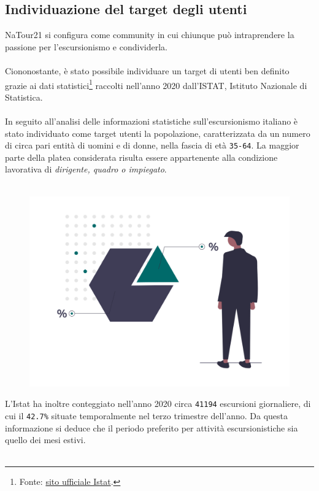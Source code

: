 \documentclass{natourDoc}
\begin{document}
\subsection{Individuazione del target degli utenti}
NaTour21 si configura come community in cui chiunque può intraprendere la passione per l'escursionismo e condividerla.\\\\
Ciononostante, è stato possibile individuare un target di utenti ben definito grazie ai dati
statistici\footnote{Fonte: \href{http://dati.istat.it/Index.aspx?DataSetCode=DCCV_ESC_CAPI}{sito ufficiale Istat}.} raccolti
nell'anno 2020 dall'ISTAT, Istituto Nazionale di Statistica.\\\\
In seguito all'analisi delle informazioni statistiche sull'escursionismo italiano è stato individuato come target utenti la popolazione, caratterizzata da un
numero di circa pari entità di uomini e di donne, nella fascia di età \texttt{35-64}. La maggior parte della
platea considerata risulta essere appartenente alla condizione lavorativa di \textit{dirigente, quadro o impiegato}.\\\\
\begin{figure}[!htbp]
	\centering
	\includegraphics[width=12cm, page=1]{./logos/undraw_statistic_chart_38b6.png}
\end{figure}
\FloatBarrier
L'Istat ha inoltre conteggiato nell'anno 2020 circa \texttt{41194} escursioni giornaliere,
di cui il \texttt{42.7\%} situate temporalmente nel terzo trimestre dell'anno. Da questa informazione si deduce che il periodo
preferito per attività escursionistiche sia quello dei mesi estivi.\\\\
\end{document}
